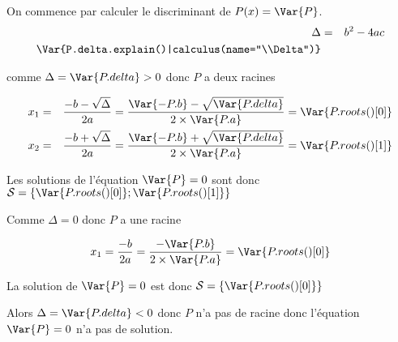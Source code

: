 
    On commence par calculer le discriminant de $P(x) = \Var{P}$.
    \begin{eqnarray*}
        \Delta & = & b^2-4ac \\
        \Var{P.delta.explain()|calculus(name="\\Delta")}
    \end{eqnarray*}

    comme $\Delta = \Var{P.delta} > 0$ donc $P$ a deux racines

    \begin{eqnarray*}
        x_1 & = & \frac{-b - \sqrt{\Delta}}{2a} =  \frac{\Var{-P.b} - \sqrt{\Var{P.delta}}}{2 \times \Var{P.a}} = \Var{P.roots()[0] } \\
        x_2 & = & \frac{-b + \sqrt{\Delta}}{2a} =  \frac{\Var{-P.b} + \sqrt{\Var{P.delta}}}{2 \times \Var{P.a}} = \Var{P.roots()[1] }
    \end{eqnarray*}

    Les solutions de l'équation $\Var{P} = 0$ sont donc $\mathcal{S} = \left\{ \Var{P.roots()[0]}; \Var{P.roots()[1]} \right\}$

    Comme $\Delta = 0$ donc $P$ a une racine

    \begin{eqnarray*}
        x_1 = \frac{-b}{2a} = \frac{-\Var{P.b}}{2\times \Var{P.a}} = \Var{P.roots()[0]} \\
    \end{eqnarray*}

    La solution de $\Var{P} = 0$ est donc $\mathcal{S} = \left\{ \Var{P.roots()[0]}\right\}$

    Alors $\Delta = \Var{P.delta} < 0$ donc $P$ n'a pas de racine donc l'équation $\Var{P} = 0$ n'a pas de solution.


